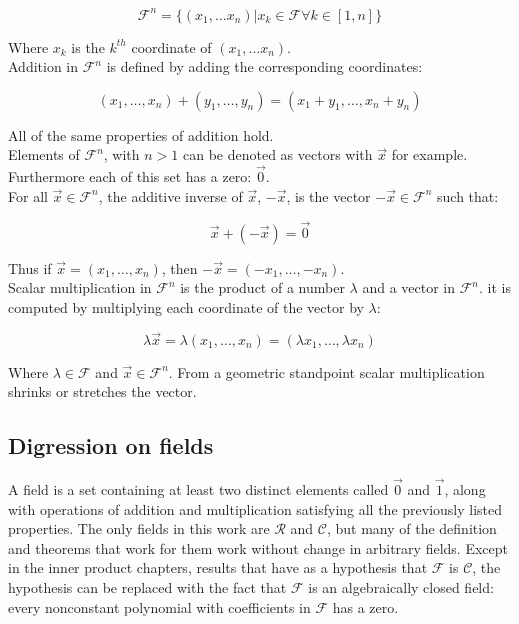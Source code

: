   $$\mathcal{F}^n = \{(x_1, \dots x_n) | x_k\in\mathcal{F}\forall k \in [1,n]\}$$

  Where $x_k$ is the $k^{th}$ coordinate of $(x_1, \dots x_n)$.\\

  Addition in $\mathcal{F}^n$ is defined by adding the corresponding coordinates:

  $$(x_1,\dots, x_n) + (y_1, \dots, y_n) = (x_1 + y_1, \dots, x_n+y_n)$$

  All of the same properties of addition hold.\\

  Elements of $\mathcal{F}^n$, with $n > 1$ can be denoted as vectors with $\vec{x}$ for example.
  Furthermore each of this set has a zero: $\vec{0}$.\\

  For all $\vec{x}\in\mathcal{F}^n$, the additive inverse of $\vec{x}$, $-\vec{x}$, is the vector $-\vec{x}\in\mathcal{F}^n$ such that:

  $$\vec{x} + (-\vec{x}) = \vec{0}$$

  Thus if $\vec{x} = (x_1, \dots, x_n)$, then $-\vec{x} = (-x_1, \dots, -x_n)$.\\

  Scalar multiplication in $\mathcal{F}^n$ is the product of a number $\lambda$ and a vector in $\mathcal{F}^n$.
  it is computed by multiplying each coordinate of the vector by $\lambda$:

  $$\lambda\vec{x} = \lambda(x_1,\dots, x_n) = (\lambda x_1, \dots, \lambda x_n)$$

  Where $\lambda\in\mathcal{F}$ and $\vec{x}\in\mathcal{F}^n$.
  From a geometric standpoint scalar multiplication shrinks or stretches the vector.

  \subsection{Digression on fields}
  A field is a set containing at least two distinct elements called $\vec{0}$ and $\vec{1}$, along with operations of addition and multiplication satisfying all the previously listed properties.
  The only fields in this work are $\mathcal{R}$ and $\mathcal{C}$, but many of the definition and theorems that work for them work without change in arbitrary fields.
  Except in the inner product chapters, results that have as a hypothesis that $\mathcal{F}$ is $\mathcal{C}$, the hypothesis can be replaced with the fact that $\mathcal{F}$ is an algebraically closed field: every nonconstant polynomial with coefficients in $\mathcal{F}$ has a zero.

